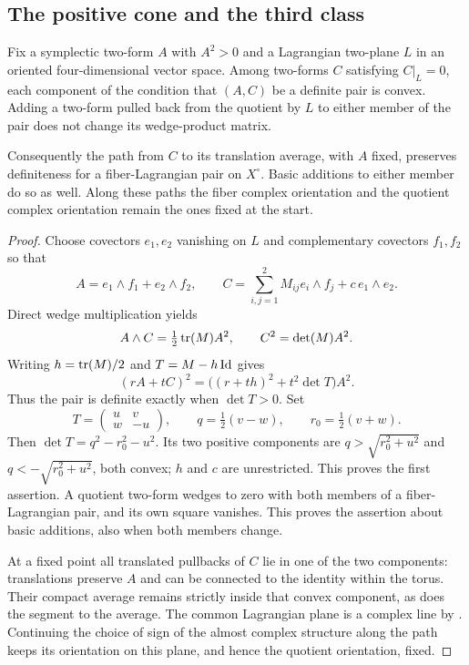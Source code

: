 \subsection{The positive cone and the third class}

\begin{lemma}\label{lem:regular-mixed-cone}
Fix a symplectic two-form $A$ with $A^2>0$ and a Lagrangian two-plane $L$ in an
oriented four-dimensional vector space.  Among two-forms $C$ satisfying
$C|_L=0$, each component of the condition that $(A,C)$ be a definite
pair is convex.  Adding a two-form pulled back from the quotient by
$L$ to either member of the pair does not change its wedge-product
matrix.

Consequently the path from $C$ to its translation average, with $A$
fixed, preserves definiteness for a fiber-Lagrangian pair on $X^\circ$.
Basic additions to either member do so as well.  Along these paths the
fiber complex orientation and the quotient complex orientation remain
the ones fixed at the start.
\end{lemma}

\begin{proof}
Choose covectors $e_1,e_2$ vanishing on $L$ and complementary covectors
$f_1,f_2$ so that
\[
 A=e_1\wedge f_1+e_2\wedge f_2,
 \qquad
 C=\sum_{i,j=1}^2 M_{ij}e_i\wedge f_j+c\,e_1\wedge e_2.
\]
Direct wedge multiplication yields
\[
 A\wedge C=\tfrac12\operatorname{tr}(M)A^2,
 \qquad C^2=\det(M)A^2.
\]
Writing $h=\operatorname{tr}(M)/2$ and $T=M-h\operatorname{Id}$ gives
\begin{equation}\label{eq:regular-mixed-square}
 (rA+tC)^2=\bigl((r+th)^2+t^2\det T\bigr)A^2.
\end{equation}
Thus the pair is definite exactly when $\det T>0$.  Set
\[
 T=\begin{pmatrix}u&v\\w&-u\end{pmatrix},\qquad
 q=\tfrac12(v-w),\qquad r_0=\tfrac12(v+w).
\]
Then $\det T=q^2-r_0^2-u^2$.  Its two positive components are
$q>\sqrt{r_0^2+u^2}$ and $q<-\sqrt{r_0^2+u^2}$, both convex; $h$ and
$c$ are unrestricted.  This proves the first assertion.  A quotient
two-form wedges to zero with both members of a fiber-Lagrangian pair,
and its own square vanishes.  This proves the assertion about basic
additions, also when both members change.

At a fixed point all translated pullbacks of $C$ lie in one of the two
components: translations preserve $A$ and can be connected to the
identity within the torus.  Their compact average remains strictly
inside that convex component, as does the segment to the average.
The common Lagrangian plane is a complex line by
.  Continuing the choice of sign of the almost
complex structure along the path keeps its orientation on this plane,
and hence the quotient orientation, fixed.
\end{proof}

